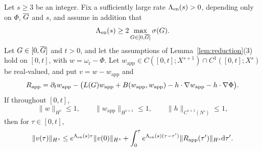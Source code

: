 \begin{lemma}
\label{lem:energy}
Let $s\ge3$ be an integer. Fix a sufficiently large rate $\Lambda_{\mathrm{en}}(s)>0$,
depending only on $\Phi$, $\overline{G}$ and $s$, and assume in addition that
\begin{equation}
\label{eq:Lambda}
\Lambda_{\mathrm{en}}(s)\ge2\max_{G\in[0,\overline{G}]}\sigma(G).
\end{equation}
Let $G\in[0,\overline{G}]$
and $t>0$, and let the assumptions of Lemma~\ref{lem:reduction}\textup{(3)} hold on
$[0,t]$, with $w=\omega_{\mathrm r}-\Phi$. Let
$w_{\mathrm{app}}\in C([0,t];X^{s+1})\cap C^1([0,t];X^s)$ be real-valued, and put
$v=w-w_{\mathrm{app}}$ and
\[
R_{\mathrm{app}}=\partial_tw_{\mathrm{app}}-\big(L(G)w_{\mathrm{app}}+B(w_{\mathrm{app}},w_{\mathrm{app}})-h\cdot\nabla w_{\mathrm{app}}-h\cdot\nabla\Phi\big).
\]
If throughout $[0,t]$,
\[
\|w\|_{H^s}\le1,\qquad
\|w_{\mathrm{app}}\|_{H^{s+1}}\le1,\qquad
\|h\|_{C^{s+1}(N')}\le1,
\]
then for
$\tau\in[0,t]$,
\[
\|v(\tau)\|_{H^s}\le e^{\Lambda_{\mathrm{en}}(s)\tau}\|v(0)\|_{H^s}+\int_0^\tau e^{\Lambda_{\mathrm{en}}(s)(\tau-\tau')}\|R_{\mathrm{app}}(\tau')\|_{H^s}\dd\tau' .
\]
\end{lemma}
